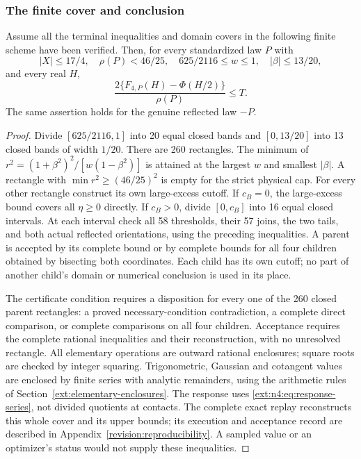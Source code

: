 \subsubsection{The finite cover and conclusion}
\begin{proposition}
\label{ext:n4:prop:certificate}
Assume all the terminal inequalities and domain covers in the following
finite scheme have been verified. Then, for every standardized law $P$ with
\[
 |X|\le17/4,\quad \rho(P)<46/25,\quad
 625/2116\le w\le1,\quad |\beta|\le13/20,
\]
and every real $H$,
\[
 \frac{2\{F_{4,P}(H)-\Phi(H/2)\}}{\rho(P)}\le T.
\]
The same assertion holds for the genuine reflected law $-P$.
\end{proposition}
\begin{proof}
Divide $[625/2116,1]$ into 20 equal closed bands and $[0,13/20]$
into 13 closed bands of width $1/20$. There are 260 rectangles.
The minimum of
$r^2=(1+\beta^2)^2/[w(1-\beta^2)]$ is attained at the
largest $w$ and smallest $|\beta|$. A rectangle with
$\min r^2\ge(46/25)^2$ is empty for the strict physical cap.
For every other rectangle construct its own large-excess cutoff.
If $c_B=0$, the large-excess bound covers all $\eta\ge0$ directly.
If $c_B>0$, divide $[0,c_B]$ into 16 equal closed intervals. At each interval
check all 58 thresholds, their 57 joins, the two tails, and both
actual reflected orientations, using the preceding inequalities.
A parent is accepted by its complete bound or by complete bounds
for all four children obtained by bisecting both coordinates.
Each child has its own cutoff; no part of another child's domain
or numerical conclusion is used in its place.

The certificate condition requires a disposition for every one of the
260 closed parent rectangles: a proved necessary-condition contradiction,
a complete direct comparison, or complete comparisons on all four children.
Acceptance requires the complete rational inequalities and their
reconstruction, with no unresolved rectangle.
All elementary operations
are outward rational enclosures; square roots are checked by integer
squaring. Trigonometric, Gaussian and cotangent values are enclosed
by finite series with analytic remainders, using the arithmetic
rules of Section~\ref{ext:elementary-enclosures}. The response uses
\eqref{ext:n4:eq:response-series}, not divided quotients at contacts.
The complete exact replay reconstructs this whole cover and its upper
bounds; its execution and acceptance record are described in
Appendix~\ref{revision:reproducibility}. A sampled value or an optimizer's
status would not supply these inequalities.


\end{proof}
